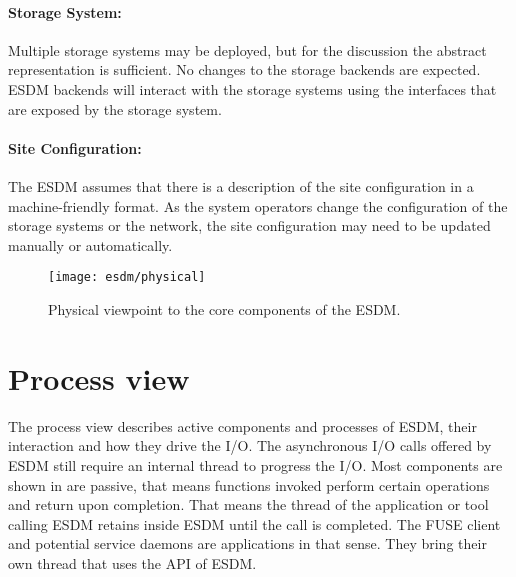 \paragraph{Storage System:} Multiple storage systems may be deployed, but for the discussion the abstract representation is sufficient.
No changes to the storage backends are expected.
ESDM backends will interact with the storage systems using the interfaces that are exposed by the storage system.

\paragraph{Site Configuration:} The ESDM assumes that there is a description of the site configuration in a machine-friendly format. As the system operators change the configuration of the storage systems or the network, the site configuration may need to be updated manually or automatically.




\begin{figure}
	\centering
	\texttt{[image: esdm/physical]}
	\caption{Physical viewpoint to the core components of the ESDM.}
	\label{fig:viewpoint physical}
\end{figure}














\section{Process view}
\label{sec: viewpoints/process}

The process view describes active components and processes of ESDM, their interaction and how they drive the I/O.
The asynchronous I/O calls offered by ESDM still require an internal thread to progress the I/O.
Most components are shown in  are passive, that means functions invoked perform certain operations and return upon completion.
That means the thread of the application or tool calling ESDM retains inside ESDM until the call is completed.
The FUSE client and potential service daemons are applications in that sense. They bring their own thread that uses the API of ESDM.

